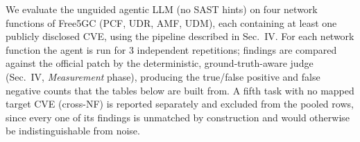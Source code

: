 
We evaluate the unguided agentic LLM (no SAST hints) on four network
functions of Free5GC (PCF, UDR, AMF, UDM), each containing at least one
publicly disclosed CVE, using the pipeline described in Sec.~IV. For
each network function the agent is run for 3 independent repetitions;
findings are compared against the official patch by the deterministic,
ground-truth-aware judge (Sec.~IV, \emph{Measurement} phase), producing
the true/false positive and false negative counts that the tables below
are built from. A fifth task with no mapped target CVE (cross-NF) is
reported separately and excluded from the pooled rows, since every one
of its findings is unmatched by construction and would otherwise be
indistinguishable from noise.


